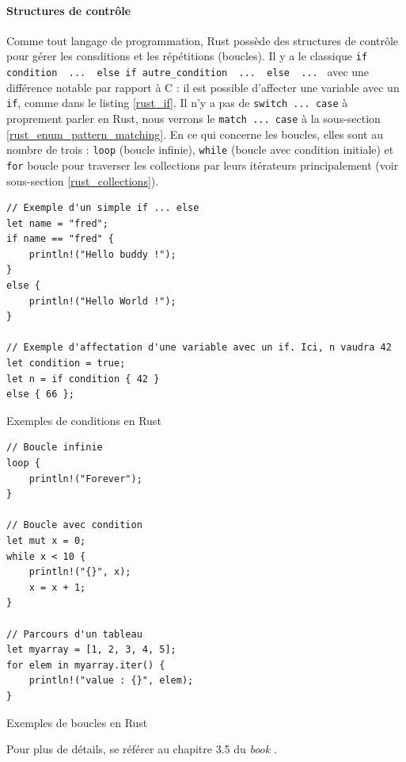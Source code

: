 \documentclass[a4paper, 12pt]{article}
\newenvironment{code}{\captionsetup{type=listing}}{}
\begin{document}
\paragraph{Structures de contrôle}
Comme tout langage de programmation, Rust possède des structures de contrôle pour gérer les 
consditions et les répétitions (boucles). Il y a le classique \texttt{if condition 
{ ... } else if autre_condition { ... } else { ... }} avec une différence notable par rapport à C : 
il est possible d'affecter une variable avec un \texttt{if}, comme dans le listing 
\ref{rust_if}. Il n'y a pas de \texttt{switch ... case} à proprement parler en Rust, 
nous verrons le \texttt{match ... case} à la sous-section \ref{rust_enum_pattern_matching}.
En ce qui concerne les boucles, elles sont au nombre de trois : \texttt{loop} (boucle 
infinie), \texttt{while} (boucle avec condition initiale) et \texttt{for} 
boucle pour traverser les collections par leurs itérateurs principalement (voir sous-section 
\ref{rust_collections}).
\bigbreak
\begin{code}
    \begin{verbatim}
// Exemple d'un simple if ... else
let name = "fred";
if name == "fred" {
    println!("Hello buddy !");
}
else {
    println!("Hello World !");
}

// Exemple d'affectation d'une variable avec un if. Ici, n vaudra 42
let condition = true;
let n = if condition { 42 }
else { 66 };
    \end{verbatim}
    \caption{Exemples de conditions en Rust}
    \label{rust_if}
\end{code}
\bigbreak
\begin{code}
    \begin{verbatim}
// Boucle infinie
loop {
    println!("Forever");
}

// Boucle avec condition
let mut x = 0;
while x < 10 {
    println!("{}", x);
    x = x + 1;
}

// Parcours d'un tableau
let myarray = [1, 2, 3, 4, 5];
for elem in myarray.iter() {
    println!("value : {}", elem);
}
    \end{verbatim}
    \caption{Exemples de boucles en Rust}
    \label{rust_loop}
\end{code}
\bigbreak
Pour plus de détails, se référer au chapitre 3.5 du \textit{book} \cite{ref0}.
\end{document}
